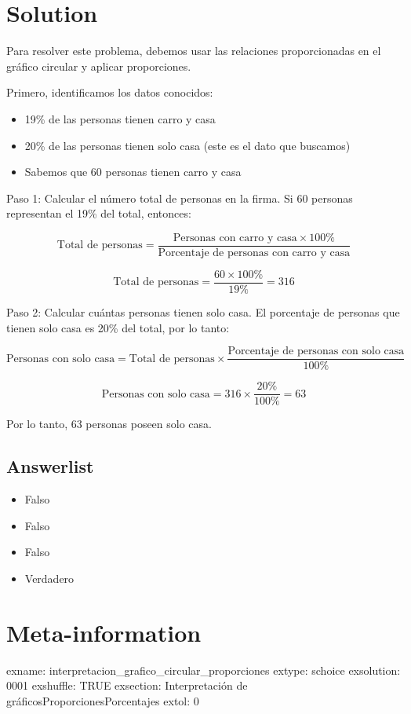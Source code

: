 \documentclass[
]{article}
\providecommand{\tightlist}{%
  \setlength{\itemsep}{0pt}\setlength{\parskip}{0pt}}
\begin{document}
\section{Solution}\label{solution}

Para resolver este problema, debemos usar las relaciones proporcionadas
en el gráfico circular y aplicar proporciones.

Primero, identificamos los datos conocidos:

\begin{itemize}
\tightlist
\item
  19\% de las personas tienen carro y casa
\item
  20\% de las personas tienen solo casa (este es el dato que buscamos)
\item
  Sabemos que 60 personas tienen carro y casa
\end{itemize}

Paso 1: Calcular el número total de personas en la firma. Si 60 personas
representan el 19\% del total, entonces:

\[\text{Total de personas} = \frac{\text{Personas con carro y casa} \times 100\%}{\text{Porcentaje de personas con carro y casa}}\]

\[\text{Total de personas} = \frac{60 \times 100\%}{19\%} = 316\]

Paso 2: Calcular cuántas personas tienen solo casa. El porcentaje de
personas que tienen solo casa es 20\% del total, por lo tanto:

\[\text{Personas con solo casa} = \text{Total de personas} \times \frac{\text{Porcentaje de personas con solo casa}}{100\%}\]

\[\text{Personas con solo casa} = 316 \times \frac{20\%}{100\%} = 63\]

Por lo tanto, 63 personas poseen solo casa.

\subsection{Answerlist}\label{answerlist-1}

\begin{itemize}
\tightlist
\item
  Falso
\item
  Falso
\item
  Falso
\item
  Verdadero
\end{itemize}

\section{Meta-information}\label{meta-information}

exname: interpretacion\_grafico\_circular\_proporciones extype: schoice
exsolution: 0001 exshuffle: TRUE exsection: Interpretación de
gráficos\textbar Proporciones\textbar Porcentajes extol: 0
\end{document}
